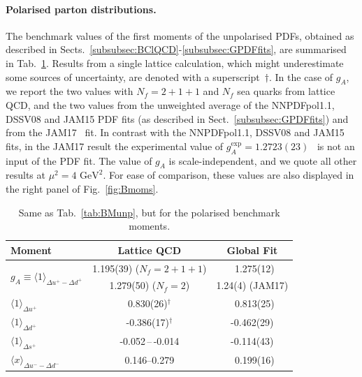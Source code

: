 \paragraph{Polarised parton distributions.}
%
%
The benchmark values of the first moments of the unpolarised PDFs, obtained
as described in Sects.~\ref{subsubsec:BClQCD}-\ref{subsubsec:GPDFfits}, 
are summarised in Tab.~\ref{tab:BMpol}.
%
Results from a single lattice calculation, which might underestimate some 
sources of uncertainty, are denoted with a superscript~$\dagger$.
%
In the case of $g_A$, we report the two values with $N_f=2+1+1$ and
$N_f$ sea quarks from lattice QCD, and the two values from the 
unweighted average of the NNPDFpol1.1, DSSV08 and JAM15 PDF fits
(as described in Sect.~\ref{subsubsec:GPDFfits}) and from the 
JAM17~\cite{Ethier:2017zbq} fit.
%
In contrast with the NNPDFpol1.1, DSSV08 and JAM15 fits, in the JAM17 result the experimental value of 
$g_A^{\mathrm{exp}} = 1.2723(23)$~\cite{Olive:2016xmw} is not an input of the PDF fit.
%
The value of $g_A$ is scale-independent, and we quote all other results at $\mu^2=4\mbox{ GeV}^2$.
%
For ease of comparison, these values are also displayed in 
the right panel of Fig.~\ref{fig:Bmoms}.

\begin{table}[!t]
\centering
\renewcommand{\arraystretch}{1.2}
\begin{tabular}{lcc}
\toprule
Moment & Lattice QCD & Global Fit\\
\midrule
\multirow{2}{*}{$g_A\equiv\langle 1\rangle_{\Delta u^+ - \Delta d^+}$} 
& 1.195(39) ($N_f=2+1+1$) 
& \ 1.275(12) \\
& 1.279(50) ($N_f=2$) 
& 1.24(4) (JAM17)\\
$\langle 1 \rangle_{\Delta u^+}$     
& 0.830(26)$^\dagger$ 
& \ 0.813(25)\\
$\langle 1 \rangle_{\Delta d^+}$     
& -0.386(17)$^\dagger$ 
& -0.462(29)\\
$\langle 1 \rangle_{\Delta s^+}$     
& -0.052\,--\,-0.014
& -0.114(43)\\
$\langle x\rangle_{\Delta u^- - \Delta d^-}$       
& \numrange{0.146}{0.279} 
& \ 0.199(16)\\
\bottomrule
\end{tabular}
\caption{\small Same as Tab.~\ref{tab:BMunp}, but for the polarised benchmark 
moments.}
\label{tab:BMpol}
\end{table}

